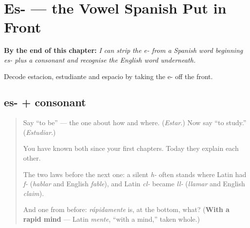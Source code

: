 
\chapter{Es- --- the Vowel Spanish Put in Front}
\label{ch:es-inicial}

\begin{chapteropening}
\textbf{By the end of this chapter:} \emph{I can strip the e- from a Spanish word beginning es- plus a consonant and recognise the English word underneath.}

Decode estacion, estudiante and espacio by taking the e- off the front.
\end{chapteropening}

\section[es- + consonant]{es- + consonant}

\label{lesson:ES-C57-es-inicial}



\begin{quote}
Say \textquotedblleft{}to be\textquotedblright{} — the one about how and where. (\emph{Estar}.) Now say \textquotedblleft{}to study.\textquotedblright{} (\emph{Estudiar}.)

You have known both since your first chapters. Today they explain each other.

The two laws before the next one: a silent \emph{h-} often stands where Latin had \emph{f-} (\emph{hablar} and English \emph{fable}), and Latin \emph{cl-} became \emph{ll-} (\emph{llamar} and English \emph{claim}).

And one from before: \emph{rápidamente} is, at the bottom, what? (\textbf{With a rapid mind} — Latin \emph{mente}, \textquotedblleft{}with a mind,\textquotedblright{} taken whole.)
\end{quote}

